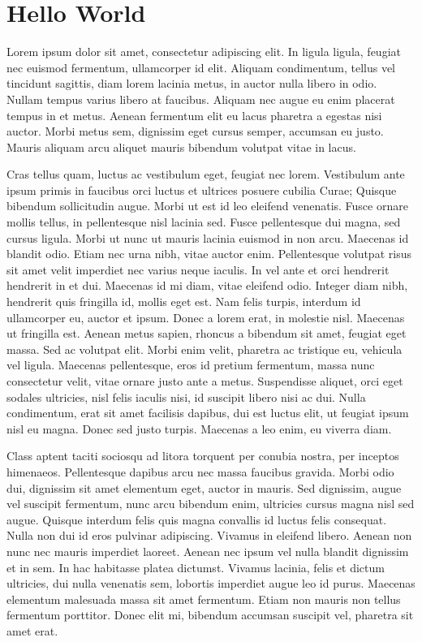 \documentclass[letterpaper,12pt,twocolumn,landscape]{memoir}
\begin{document}
\chapter*{Hello World}
\beginnumbering
\pstart
Lorem ipsum dolor sit amet, consectetur adipiscing elit. In ligula ligula, feugiat nec euismod fermentum, ullamcorper id elit. Aliquam condimentum, tellus vel tincidunt sagittis, diam lorem lacinia metus, in auctor nulla libero in odio. Nullam tempus varius libero at faucibus. Aliquam nec augue eu enim placerat tempus in et metus. Aenean fermentum elit eu lacus pharetra a egestas nisi auctor. Morbi metus sem, dignissim eget cursus semper, accumsan eu justo. Mauris aliquam arcu aliquet mauris bibendum volutpat vitae in lacus.

Cras tellus quam, luctus ac vestibulum eget, feugiat nec lorem. Vestibulum ante ipsum primis in faucibus orci luctus et ultrices posuere cubilia Curae; Quisque bibendum sollicitudin augue. Morbi ut est id leo eleifend venenatis. Fusce ornare mollis tellus, in pellentesque nisl lacinia sed. Fusce pellentesque dui magna, sed cursus ligula. Morbi ut nunc ut mauris lacinia euismod in non arcu. Maecenas id blandit odio. Etiam nec urna nibh, vitae auctor enim. Pellentesque volutpat risus sit amet velit imperdiet nec varius neque iaculis. In vel ante et orci hendrerit hendrerit in et dui. Maecenas id mi diam, vitae eleifend odio. Integer diam nibh, hendrerit quis fringilla id, mollis eget est. Nam felis turpis, interdum id ullamcorper eu, auctor et ipsum. Donec a lorem erat, in molestie nisl. Maecenas ut fringilla est.
Aenean metus sapien, rhoncus a bibendum sit amet, feugiat eget massa. Sed ac volutpat elit. Morbi enim velit, pharetra ac tristique eu, vehicula vel ligula. Maecenas pellentesque, eros id pretium fermentum, massa nunc consectetur velit, vitae ornare justo ante a metus. Suspendisse aliquet, orci eget sodales ultricies, nisl felis iaculis nisi, id suscipit libero nisi ac dui. Nulla condimentum, erat sit amet facilisis dapibus, dui est luctus elit, ut feugiat ipsum nisl eu magna. Donec sed justo turpis. Maecenas a leo enim, eu viverra diam.

Class aptent taciti sociosqu ad litora torquent per conubia nostra, per inceptos himenaeos. Pellentesque dapibus arcu nec massa faucibus gravida. Morbi odio dui, dignissim sit amet elementum eget, auctor in mauris. Sed dignissim, augue vel suscipit fermentum, nunc arcu bibendum enim, ultricies cursus magna nisl sed augue. Quisque interdum felis quis magna convallis id luctus felis consequat. Nulla non dui id eros pulvinar adipiscing. Vivamus in eleifend libero. Aenean non nunc nec mauris imperdiet laoreet. Aenean nec ipsum vel nulla blandit dignissim et in sem. In hac habitasse platea dictumst. Vivamus lacinia, felis et dictum ultricies, dui nulla venenatis sem, lobortis imperdiet augue leo id purus. Maecenas elementum malesuada massa sit amet fermentum. Etiam non mauris non tellus fermentum porttitor. Donec elit mi, bibendum accumsan suscipit vel, pharetra sit amet erat.
\end{document}
